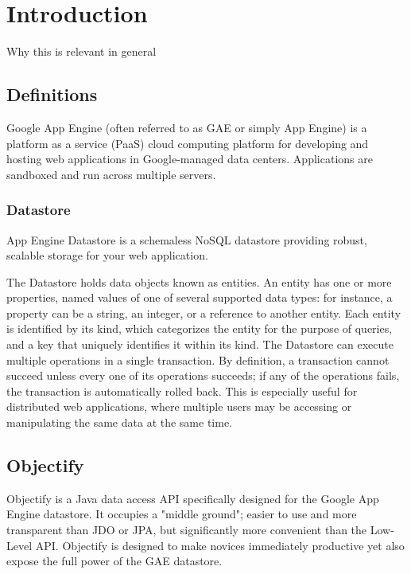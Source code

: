 \chapter{Introduction}

Why this is relevant in general

\section{Definitions}

Google App Engine (often referred to as GAE or simply App Engine) is a platform as a service (PaaS) cloud computing platform for developing and hosting web applications in Google-managed data centers. Applications are sandboxed and run across multiple servers.

\subsection{Datastore}

App Engine Datastore is a schemaless NoSQL datastore providing robust, scalable storage for your web application.

The Datastore holds data objects known as entities. An entity has one or more properties, named values of one of several supported data types: for instance, a property can be a string, an integer, or a reference to another entity. Each entity is identified by its kind, which categorizes the entity for the purpose of queries, and a key that uniquely identifies it within its kind. The Datastore can execute multiple operations in a single transaction. By definition, a transaction cannot succeed unless every one of its operations succeeds; if any of the operations fails, the transaction is automatically rolled back. This is especially useful for distributed web applications, where multiple users may be accessing or manipulating the same data at the same time.


\section{Objectify}

Objectify is a Java data access API specifically designed for the Google App Engine datastore. It occupies a "middle ground"; easier to use and more transparent than JDO or JPA, but significantly more convenient than the Low-Level API. Objectify is designed to make novices immediately productive yet also expose the full power of the GAE datastore.
